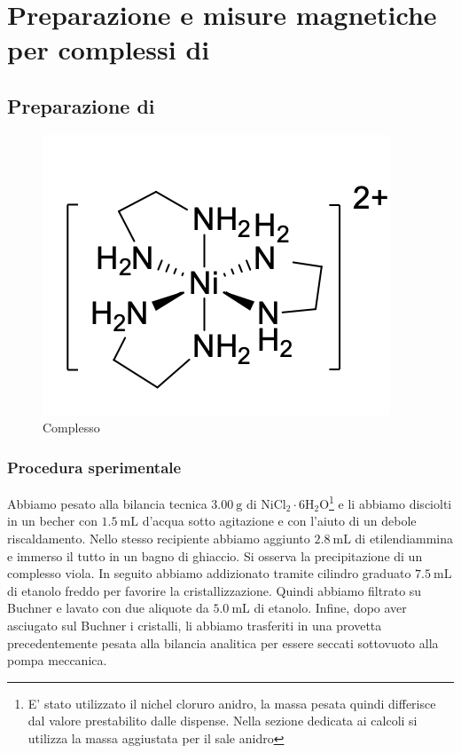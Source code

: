 
\section{Preparazione e misure magnetiche per complessi di }

\subsection{Preparazione di  }
\begin{figure}[ht!]
    \centering
    \includegraphics[width=0.3\linewidth]{foto/nien.png}
    \caption{Complesso  }
    \label{fig:nien}
\end{figure}
\subsubsection{Procedura sperimentale}
Abbiamo pesato alla bilancia tecnica $3.00 \mathrm{~g}$ di $\mathrm{NiCl}_2 \cdot 6 \mathrm{H}_2 \mathrm{O}$\footnote{ E' stato utilizzato il nichel cloruro anidro, la massa pesata quindi differisce dal valore prestabilito dalle dispense. Nella sezione dedicata ai calcoli si utilizza la massa aggiustata per il sale anidro} e li abbiamo disciolti in un becher con $1.5 \mathrm{~mL}$ d'acqua sotto agitazione e con l'aiuto di un debole riscaldamento. Nello stesso recipiente abbiamo aggiunto $2.8 \mathrm{~mL}$ di etilendiammina e immerso il tutto in un bagno di ghiaccio. Si osserva la precipitazione di un complesso viola. In seguito abbiamo addizionato tramite cilindro graduato $7.5 \mathrm{~mL}$ di etanolo freddo per favorire la cristallizzazione. Quindi abbiamo filtrato su Buchner e lavato con due aliquote da $5.0 \mathrm{~mL}$ di etanolo. Infine, dopo aver asciugato sul Buchner i cristalli, li abbiamo trasferiti in una provetta precedentemente pesata alla bilancia analitica per essere seccati sottovuoto alla pompa meccanica.
